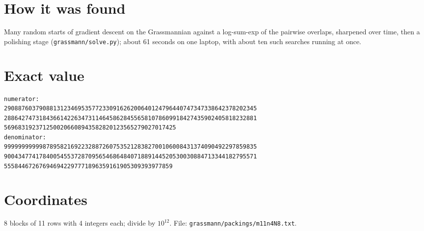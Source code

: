 \documentclass[11pt,a4paper]{article}
\begin{document}
\section{How it was found}
Many random starts of gradient descent on the Grassmannian against a log-sum-exp of the pairwise overlaps, sharpened over time, then a polishing stage (\texttt{grassmann/solve.py}); about 61 seconds on one laptop, with about ten such searches running at once.


\appendix
\section{Exact value}
{\small
\begin{verbatim}
numerator:
290887603790881312346953577233091626200640124796440747347338642378202345
288642747318436614226347311464586284556581078609918427435902405818232881
5696831923712500206608943582820123565279027017425
denominator:
999999999998789582169223288726075352128382700106008431374090492297859835
900434774178400545537287095654686484071889144520530030884713344182795571
555844672676946942297771896359161905309393977859
\end{verbatim}}

\section{Coordinates}
8 blocks of 11 rows with 4 integers each; divide by $10^{12}$. File: \texttt{grassmann/packings/m11n4N8.txt}.
{\tiny
\begin{multicols}{3}
\end{multicols}}
\end{document}
